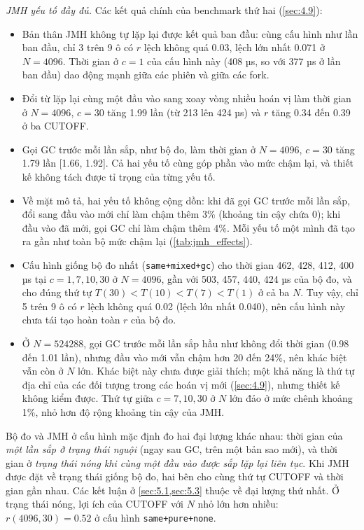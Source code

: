 \documentclass[12pt,a4paper]{article}
\begin{document}
\emph{JMH yếu tố đầy đủ.} Các kết quả chính của benchmark thứ hai (\cref{sec:4.9}):
\begin{itemize}
\item Bản thân JMH không tự lặp lại được kết quả ban đầu: cùng cấu hình như lần ban đầu, chỉ 3 trên 9 ô có $r$ lệch không quá 0.03, lệch lớn nhất 0.071 ở $N = 4096$. Thời gian ở $c = 1$ của cấu hình này (408 µs, so với 377 µs ở lần ban đầu) dao động mạnh giữa các phiên và giữa các fork.
\item Đổi từ lặp lại cùng một đầu vào sang xoay vòng nhiều hoán vị làm thời gian ở $N = 4096$, $c = 30$ tăng 1.99 lần (từ 213 lên 424 µs) và $r$ tăng 0.34 đến 0.39 ở ba CUTOFF.
\item Gọi GC trước mỗi lần sắp, như bộ đo, làm thời gian ở $N = 4096$, $c = 30$ tăng 1.79 lần [1.66, 1.92]. Cả hai yếu tố cùng góp phần vào mức chậm lại, và thiết kế không tách được tỉ trọng của từng yếu tố.
\item Về mặt mô tả, hai yếu tố không cộng dồn: khi đã gọi GC trước mỗi lần sắp, đổi sang đầu vào mới chỉ làm chậm thêm 3\% (khoảng tin cậy chứa 0); khi đầu vào đã mới, gọi GC chỉ làm chậm thêm 4\%. Mỗi yếu tố một mình đã tạo ra gần như toàn bộ mức chậm lại (\cref{tab:jmh_effects}).
\item Cấu hình giống bộ đo nhất (\texttt{same+mixed+gc}) cho thời gian 462, 428, 412, 400 µs tại $c = 1, 7, 10, 30$ ở $N = 4096$, gần với 503, 457, 440, 424 µs của bộ đo, và cho đúng thứ tự $T(30) < T(10) < T(7) < T(1)$ ở cả ba $N$. Tuy vậy, chỉ 5 trên 9 ô có $r$ lệch không quá 0.02 (lệch lớn nhất 0.040), nên cấu hình này chưa tái tạo hoàn toàn $r$ của bộ đo.
\item Ở $N = \num{524288}$, gọi GC trước mỗi lần sắp hầu như không đổi thời gian (0.98 đến 1.01 lần), nhưng đầu vào mới vẫn chậm hơn 20 đến 24\%, nên khác biệt vẫn còn ở $N$ lớn. Khác biệt này chưa được giải thích; một khả năng là thứ tự địa chỉ của các đối tượng trong các hoán vị mới (\cref{sec:4.9}), nhưng thiết kế không kiểm được. Thứ tự giữa $c = 7, 10, 30$ ở $N$ lớn đảo ở mức chênh khoảng 1\%, nhỏ hơn độ rộng khoảng tin cậy của JMH.
\end{itemize}
Bộ đo và JMH ở cấu hình mặc định đo hai đại lượng khác nhau: thời gian của \emph{một lần sắp ở trạng thái nguội} (ngay sau GC, trên một bản sao mới), và thời gian ở \emph{trạng thái nóng khi cùng một đầu vào được sắp lặp lại liên tục}. Khi JMH được đặt về trạng thái giống bộ đo, hai bên cho cùng thứ tự CUTOFF và thời gian gần nhau. Các kết luận ở \cref{sec:5.1,sec:5.3} thuộc về đại lượng thứ nhất. Ở trạng thái nóng, lợi ích của CUTOFF với $N$ nhỏ lớn hơn nhiều: $r(4096, 30) = 0.52$ ở cấu hình \texttt{same+pure+none}.
\begin{table}[htbp]
\centering\footnotesize
\caption{JMH và bộ đo của nghiên cứu: Score ở $c=30$ và $r(N, 30)$ theo cấu hình.}\label{tab:jmh}

\end{table}
\end{document}
